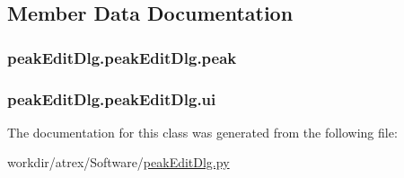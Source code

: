 \subsection{Member Data Documentation}
\hypertarget{classpeak_edit_dlg_1_1peak_edit_dlg_abd94cfb1dd7a9ed84e1955b100a0be78}{
\subsubsection[{peak}]{\setlength{\rightskip}{0pt plus 5cm}peak\-Edit\-Dlg.\-peak\-Edit\-Dlg.\-peak}}\label{classpeak_edit_dlg_1_1peak_edit_dlg_abd94cfb1dd7a9ed84e1955b100a0be78}
\hypertarget{classpeak_edit_dlg_1_1peak_edit_dlg_a0220ea9f1c4703a47098891c57e1da1f}{
\subsubsection[{ui}]{\setlength{\rightskip}{0pt plus 5cm}peak\-Edit\-Dlg.\-peak\-Edit\-Dlg.\-ui}}\label{classpeak_edit_dlg_1_1peak_edit_dlg_a0220ea9f1c4703a47098891c57e1da1f}


The documentation for this class was generated from the following file\-:\begin{DoxyCompactItemize}
\item 
workdir/atrex/\-Software/\hyperlink{peak_edit_dlg_8py}{peak\-Edit\-Dlg.\-py}\end{DoxyCompactItemize}
